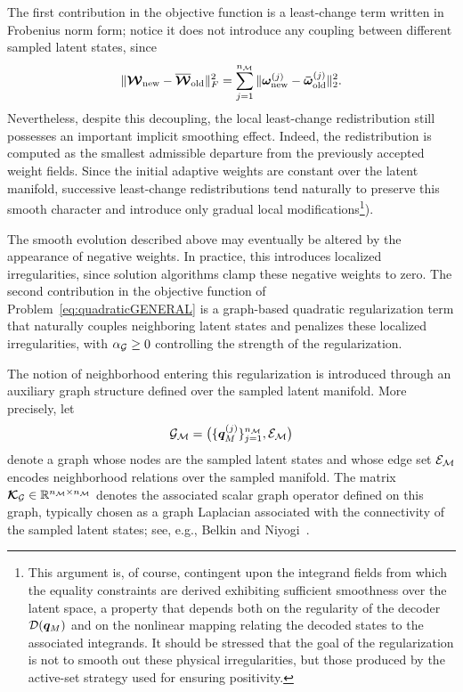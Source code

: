 \documentclass[11pt,a4paper]{article}
\begin{document}
The first contribution in the objective function is a least-change term written in Frobenius norm
form; notice it does not introduce any coupling between different sampled latent states, since
\[
\|
\boldsymbol{\mathcal{W}}_{\mathrm{new}}-\overline{\boldsymbol{\mathcal{W}}}_{\mathrm{old}}
\|_F^2
=
\sum_{j=1}^{n_{\mathcal{M}}}
\|
\bm{\omega}^{(j)}_{\mathrm{new}}-\bm{\bar{\omega}}^{(j)}_{\mathrm{old}}
\|_2^2.
\]
Nevertheless, despite this decoupling, the local least-change
redistribution still possesses an important implicit smoothing effect.
Indeed, the redistribution is computed as the smallest admissible
departure from the previously accepted weight fields. Since the initial
adaptive weights are constant over the latent manifold, successive
least-change redistributions tend naturally to preserve this smooth
character and introduce only gradual local modifications\footnote{ This argument is, of course, contingent upon the integrand fields from which the equality constraints are derived
exhibiting sufficient smoothness over the latent space, a property
that depends both on the regularity of the decoder
\(\mathcal{\boldsymbol{D}}(\bm{q}_M)\) and on the nonlinear mapping relating the decoded states
to the associated  integrands. It should be stressed that the goal of the regularization is not to smooth out these physical irregularities, but those produced by the active-set strategy used for ensuring positivity.  }).




The smooth evolution described above may eventually be altered by the
appearance of negative weights. In practice, this introduces localized irregularities, since solution algorithms    clamp these negative weights  to zero.   The second contribution in the objective function of
Problem~\eqref{eq:quadraticGENERAL} is a graph-based quadratic
regularization term that naturally couples neighboring latent states and
penalizes these localized irregularities, with \(\alpha_{\mathcal{G}}\ge0\)
controlling the strength of the regularization.

The notion of neighborhood entering this
regularization is introduced through an auxiliary graph structure
defined over the sampled latent manifold. More precisely,  let
\[
\mathcal{G}_{\mathcal{M}}
=
\big(\{\bm{q}_M^{(j)}\}_{j=1}^{n_{\mathcal{M}}},\mathcal{E}_{\mathcal{M}}\big)
\]
denote a graph whose nodes are the sampled latent states and whose edge
set \(\mathcal{E}_{\mathcal{M}}\) encodes neighborhood relations over the sampled
manifold. The matrix
$
\boldsymbol{\mathcal{K}}_{\mathcal{G}}\in\mathbb{R}^{n_{\mathcal{M}}\times n_{\mathcal{M}}}
$
denotes the associated scalar graph operator defined on this graph,
typically chosen as a graph Laplacian associated with the connectivity
of the sampled latent states; see, e.g.,
Belkin and Niyogi~\cite{belkin2003laplacian}.
\end{document}
